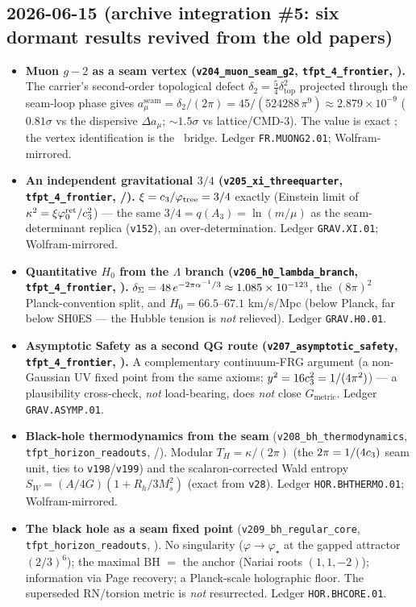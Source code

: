 \subsection*{2026-06-15 (archive integration \#5: six dormant results revived from the old papers)}
\begin{itemize}
\item \textbf{Muon $g-2$ as a seam vertex (\texttt{v204\_muon\_seam\_g2}, \texttt{tfpt\_4\_frontier}, \mC).}
  The carrier's second-order topological defect $\delta_2=\tfrac54\delta_{\mathrm{top}}^2$ projected through the
  seam-loop phase gives $a_\mu^{\mathrm{seam}}=\delta_2/(2\pi)=45/(524288\,\pi^9)\approx2.879\times10^{-9}$
  ($0.81\sigma$ vs the dispersive $\Delta a_\mu$; ${\sim}1.5\sigma$ vs lattice/CMD-3). The value is exact \mE;
  the vertex identification is the \mC\ bridge. Ledger \texttt{FR.MUONG2.01}; Wolfram-mirrored.
\item \textbf{An independent gravitational $3/4$ (\texttt{v205\_xi\_threequarter}, \texttt{tfpt\_4\_frontier}, \mE/\mC).}
  $\xi=c_3/\varphi_{\mathrm{tree}}=3/4$ exactly (Einstein limit of $\kappa^2=\xi\varphi_0^{\mathrm{ret}}/c_3^2$) --- the
  same $3/4=q(A_3)=\ln(m/\mu)$ as the seam-determinant replica (\texttt{v152}), an over-determination. Ledger
  \texttt{GRAV.XI.01}; Wolfram-mirrored.
\item \textbf{Quantitative $H_0$ from the $\Lambda$ branch (\texttt{v206\_h0\_lambda\_branch}, \texttt{tfpt\_4\_frontier}, \mC).}
  $\delta_\Sigma=48\,e^{-2\pi\alpha^{-1}/3}\approx1.085\times10^{-123}$, the $(8\pi)^2$ Planck-convention split, and
  $H_0=66.5$--$67.1$ km/s/Mpc (below Planck, far below SH0ES --- the Hubble tension is \emph{not} relieved).
  Ledger \texttt{GRAV.H0.01}.
\item \textbf{Asymptotic Safety as a second QG route (\texttt{v207\_asymptotic\_safety}, \texttt{tfpt\_4\_frontier}, \mO).}
  A complementary continuum-FRG argument (a non-Gaussian UV fixed point from the same axioms;
  $y^2=16c_3^2=1/(4\pi^2)$) --- a plausibility cross-check, \emph{not} load-bearing, does \emph{not} close
  $G_{\mathrm{metric}}$. Ledger \texttt{GRAV.ASYMP.01}.
\item \textbf{Black-hole thermodynamics from the seam} (\texttt{v208\_bh\_\allowbreak thermodynamics},
  \texttt{tfpt\_horizon\_\allowbreak readouts}, \mE/\mC).
  Modular $T_H=\kappa/(2\pi)$ (the $2\pi=1/(4c_3)$ seam unit, ties to \texttt{v198}/\texttt{v199}) and the
  scalaron-corrected Wald entropy $S_W=(A/4G)(1+R_h/3M_s^2)$ (exact from \texttt{v28}). Ledger
  \texttt{HOR.BHTHERMO.01}; Wolfram-mirrored.
\item \textbf{The black hole as a seam fixed point} (\texttt{v209\_bh\_\allowbreak regular\_core},
  \texttt{tfpt\_horizon\_\allowbreak readouts}, \mC).
  No singularity ($\varphi\to\varphi_\star$ at the gapped attractor $(2/3)^6$); the maximal BH $=$ the anchor
  (Nariai roots $(1,1,-2)$); information via Page recovery; a Planck-scale holographic floor. The superseded
  RN/torsion metric is \emph{not} resurrected. Ledger \texttt{HOR.BHCORE.01}.
\end{itemize}

